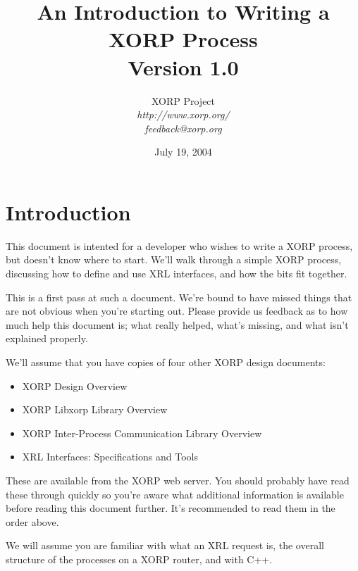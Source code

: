 \documentclass[11pt]{article}
\begin{document}
\title{An Introduction to Writing a XORP Process \\
\vspace{1ex}
Version 1.0}
\author{ XORP Project					\\
         {\it http://www.xorp.org/}			\\
	 {\it feedback@xorp.org}
}
\date{July 19, 2004}

\maketitle

\thispagestyle{empty}
\tableofcontents

\newpage
\section{Introduction}

This document is intented for a developer who wishes to write a XORP
process, but doesn't know where to start.  We'll walk through a simple
XORP process, discussing how to define and use XRL interfaces, and how
the bits fit together.  

This is a first pass at such a document.  We're bound to have missed
things that are not obvious when you're starting out.  Please provide
us feedback as to how much help this document is; what really helped,
what's missing, and what isn't explained properly.

We'll assume that you have copies of four other XORP design documents:
\begin{itemize}
\item XORP Design Overview\cite{xorp:design_arch}
\item XORP Libxorp Library Overview\cite{xorp:libxorp}
\item XORP Inter-Process Communication Library Overview\cite{xorp:xrl}
\item XRL Interfaces: Specifications and Tools\cite{xorp:xrl_interfaces}
\end{itemize}
These are available from the XORP web server.  You should probably
have read these through quickly so you're aware what additional
information is available before reading this document further.  It's
recommended to read them in the order above.  

We will assume you are familiar with what an XRL request is, the
overall structure of the processes on a XORP router, and with C++.
\end{document}
